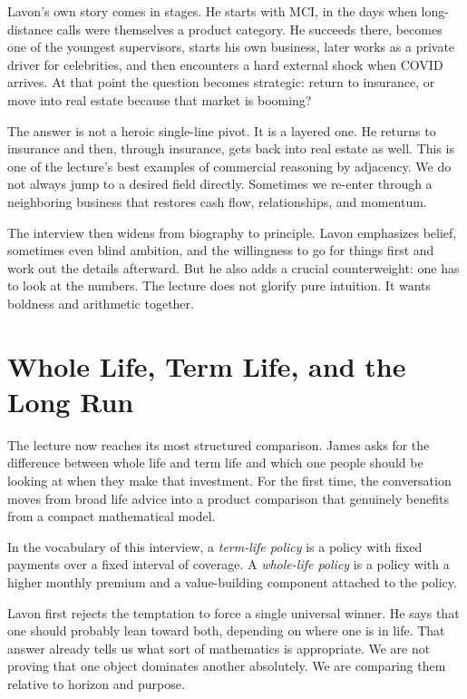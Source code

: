 Lavon's own story comes in stages. He starts with MCI, in the days when long-distance calls were themselves a product category. He succeeds there, becomes one of the youngest supervisors, starts his own business, later works as a private driver for celebrities, and then encounters a hard external shock when COVID arrives. At that point the question becomes strategic: return to insurance, or move into real estate because that market is booming?

The answer is not a heroic single-line pivot. It is a layered one. He returns to insurance and then, through insurance, gets back into real estate as well. This is one of the lecture's best examples of commercial reasoning by adjacency. We do not always jump to a desired field directly. Sometimes we re-enter through a neighboring business that restores cash flow, relationships, and momentum.

The interview then widens from biography to principle. Lavon emphasizes belief, sometimes even blind ambition, and the willingness to go for things first and work out the details afterward. But he also adds a crucial counterweight: one has to look at the numbers. The lecture does not glorify pure intuition. It wants boldness and arithmetic together.

\section{Whole Life, Term Life, and the Long Run}

The lecture now reaches its most structured comparison. James asks for the difference between whole life and term life and which one people should be looking at when they make that investment. For the first time, the conversation moves from broad life advice into a product comparison that genuinely benefits from a compact mathematical model.

\begin{definition}
In the vocabulary of this interview, a \emph{term-life policy} is a policy with fixed payments over a fixed interval of coverage. A \emph{whole-life policy} is a policy with a higher monthly premium and a value-building component attached to the policy.
\end{definition}

Lavon first rejects the temptation to force a single universal winner. He says that one should probably lean toward both, depending on where one is in life. That answer already tells us what sort of mathematics is appropriate. We are not proving that one object dominates another absolutely. We are comparing them relative to horizon and purpose.

